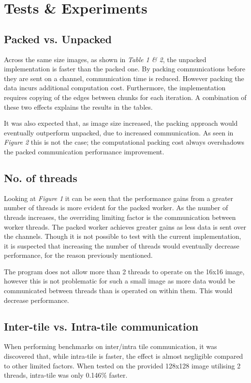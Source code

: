 \documentclass[11pt, oneside]{article}
\begin{document}
\pagebreak
\section{Tests \& Experiments}
\subsection{Packed vs. Unpacked}
Across the same size images, as shown in \emph{Table 1 \& 2}, the unpacked implementation is faster than the packed one. By packing communications before they are sent on a channel, communication time is reduced. However packing the data incurs additional computation cost. Furthermore, the implementation requires copying of the edges between chunks for each iteration. A combination of these two effects explains the results in the tables. 

It was also expected that, as image size increased, the packing approach would eventually outperform unpacked, due to increased communication. As seen in \emph{Figure 2} this is not the case; the computational packing cost always overshadows the packed communication performance improvement.

\vspace{-4mm}
\subsection{No. of threads}
\vspace{-3mm}
Looking at \emph{Figure 1} it can be seen that the performance gains from a greater number of threads is more evident for the packed worker. As the number of threads increases, the overriding limiting factor is the communication between worker threads. The packed worker achieves greater gains as less data is sent over the channels. Though it is not possible to test with the current implementation, it is suspected that increasing the number of threads would eventually decrease performance, for the reason previously mentioned.

The program does not allow more than 2 threads to operate on the 16x16 image, however this is not problematic for such a small image as more data would be communicated between threads than is operated on within them. This would decrease performance.

\vspace{-4mm}
\subsection{Inter-tile vs. Intra-tile communication}
\vspace{-3mm}
When performing benchmarks on inter/intra tile communication, it was discovered that, while intra-tile is faster, the effect is almost negligible compared to other limited factors. When tested on the provided 128x128 image utilising 2 threads, intra-tile was only 0.146\% faster.
\end{document}
